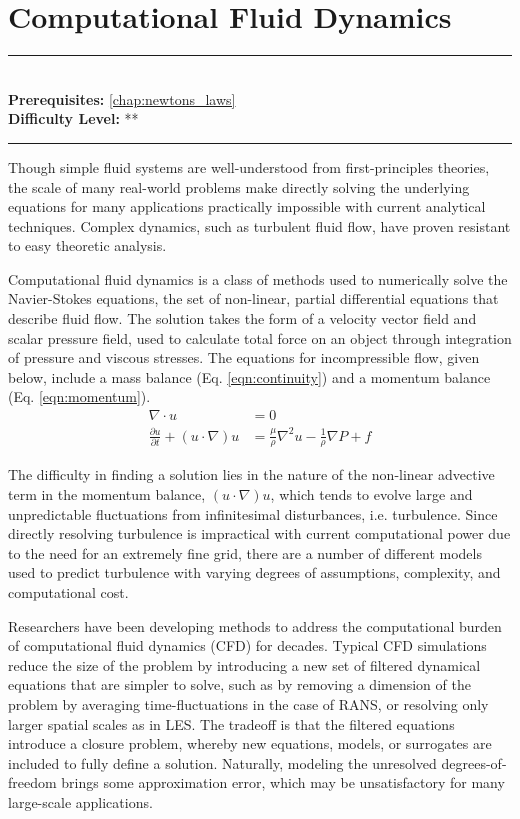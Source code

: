 \documentclass[book.tex]{subfiles}
\begin{document}
\chapter{Computational Fluid Dynamics}

\label{chap:cfd}
\noindent\rule{11cm}{0.4pt} \\
\textbf{Prerequisites:}  \autoref{chap:newtons_laws}  \\
\textbf{Difficulty Level:} ** \\
\noindent\rule{11cm}{0.4pt}
\vspace{5mm}

Though simple fluid systems are well-understood from first-principles theories, the scale of many real-world problems make directly solving the underlying equations for many applications practically impossible with current analytical techniques. Complex dynamics, such as turbulent fluid flow, have proven resistant to easy theoretic analysis. 

Computational fluid dynamics is a class of methods used to numerically solve the Navier-Stokes equations, the set of non-linear, partial differential equations that describe fluid flow. The solution takes the form of a velocity vector field and scalar pressure field, used to calculate total force on an object through integration of pressure and viscous stresses. The equations for incompressible flow, given below, include a mass balance (Eq. \ref{eqn:continuity}) and a momentum balance (Eq. \ref{eqn:momentum}).
\begin{align}
\label{eqn:continuity}
\nabla \cdot u &=0 \\
\label{eqn:momentum}
\frac{\partial u}{\partial t}+(u \cdot \nabla)u&=\frac{\mu}{\rho} \nabla^2 u-\frac{1}{\rho} \nabla P + f
\end{align}

The difficulty in finding a solution lies in the nature of the non-linear advective term in the momentum balance, $(u \cdot \nabla)u$, which tends to evolve large and unpredictable fluctuations from infinitesimal disturbances, i.e. turbulence. Since directly resolving turbulence is impractical with current computational power due to the need for an extremely fine grid, there are a number of different models used to predict turbulence with varying degrees of assumptions, complexity, and computational cost. 

Researchers have been developing methods to address the computational burden of computational fluid dynamics (CFD) for decades. Typical CFD simulations reduce the size of the problem by introducing a new set of filtered dynamical equations that are simpler to solve, such as by removing a dimension of the problem by averaging time-fluctuations in the case of RANS, or resolving only larger spatial scales as in LES. The tradeoff is that the filtered equations introduce a closure problem, whereby new equations, models, or surrogates are included to fully define a solution. Naturally, modeling the unresolved degrees-of-freedom brings some approximation error, which may be unsatisfactory for many large-scale applications. 
\end{document}
